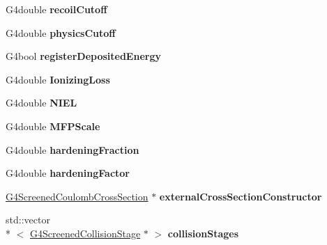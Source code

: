 \begin{DoxyCompactItemize}
\item 
\hypertarget{classG4ScreenedNuclearRecoil_ad3319321c3b8319822dc9d4a11e046d2}{G4double {\bfseries recoil\-Cutoff}}\label{classG4ScreenedNuclearRecoil_ad3319321c3b8319822dc9d4a11e046d2}

\item 
\hypertarget{classG4ScreenedNuclearRecoil_a8d61b6227a742762fe364e1f376d3265}{G4double {\bfseries physics\-Cutoff}}\label{classG4ScreenedNuclearRecoil_a8d61b6227a742762fe364e1f376d3265}

\item 
\hypertarget{classG4ScreenedNuclearRecoil_a216384f2d51fb1a347124b977e093c05}{G4bool {\bfseries register\-Deposited\-Energy}}\label{classG4ScreenedNuclearRecoil_a216384f2d51fb1a347124b977e093c05}

\item 
\hypertarget{classG4ScreenedNuclearRecoil_afa3ff45a02312f7b6a6c1d500fd01f28}{G4double {\bfseries Ionizing\-Loss}}\label{classG4ScreenedNuclearRecoil_afa3ff45a02312f7b6a6c1d500fd01f28}

\item 
\hypertarget{classG4ScreenedNuclearRecoil_ad659b5541a6a1e34109bf3a38a805cf7}{G4double {\bfseries N\-I\-E\-L}}\label{classG4ScreenedNuclearRecoil_ad659b5541a6a1e34109bf3a38a805cf7}

\item 
\hypertarget{classG4ScreenedNuclearRecoil_a3dd51e98d3a0ce4c351633bd79eac590}{G4double {\bfseries M\-F\-P\-Scale}}\label{classG4ScreenedNuclearRecoil_a3dd51e98d3a0ce4c351633bd79eac590}

\item 
\hypertarget{classG4ScreenedNuclearRecoil_ad07667d26ae00e2498cdb6ed9c96f4c6}{G4double {\bfseries hardening\-Fraction}}\label{classG4ScreenedNuclearRecoil_ad07667d26ae00e2498cdb6ed9c96f4c6}

\item 
\hypertarget{classG4ScreenedNuclearRecoil_a988377cb58e0d3ea9e9b8b47fdff0668}{G4double {\bfseries hardening\-Factor}}\label{classG4ScreenedNuclearRecoil_a988377cb58e0d3ea9e9b8b47fdff0668}

\item 
\hypertarget{classG4ScreenedNuclearRecoil_ae7c806b57b6b3af7dae77fa53ed76e8a}{\hyperlink{classG4ScreenedCoulombCrossSection}{G4\-Screened\-Coulomb\-Cross\-Section} $\ast$ {\bfseries external\-Cross\-Section\-Constructor}}\label{classG4ScreenedNuclearRecoil_ae7c806b57b6b3af7dae77fa53ed76e8a}

\item 
\hypertarget{classG4ScreenedNuclearRecoil_a0d3ecbaa25714e7a92a69fcae7833662}{std\-::vector\\*
$<$ \hyperlink{classG4ScreenedCollisionStage}{G4\-Screened\-Collision\-Stage} $\ast$ $>$ {\bfseries collision\-Stages}}\label{classG4ScreenedNuclearRecoil_a0d3ecbaa25714e7a92a69fcae7833662}


\end{DoxyCompactItemize}
